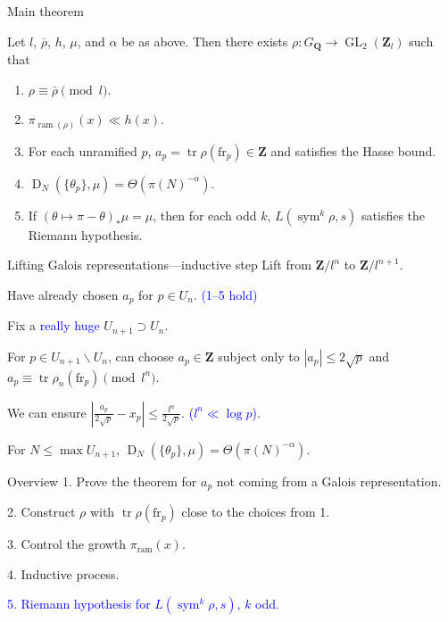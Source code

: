 \documentclass{beamer}
\DeclareMathOperator{\D}{D}
\DeclareMathOperator{\GL}{GL}
\DeclareMathOperator{\ram}{ram}
\DeclareMathOperator{\sym}{sym}
\DeclareMathOperator{\tr}{tr}
\newcommand{\bQ}{\mathbf{Q}}
\newcommand{\bZ}{\mathbf{Z}}
\newcommand{\frob}{\mathrm{fr}}
\begin{document}
\begin{frame}{Main theorem}
\begin{theorem}[M.]
Let $l$, $\bar\rho$, $h$, $\mu$, and $\alpha$ be as above. Then there exists 
$\rho\colon G_\bQ \to \GL_2(\bZ_l)$ such that 
\begin{enumerate}
\item
$\rho \equiv \bar\rho\pmod{l}$. 

\item
$\pi_{\ram(\rho)}(x) \ll h(x)$. 

\item
For each unramified $p$, $a_p = \tr \rho(\frob_p)\in \bZ$ and satisfies the 
Hasse bound.

\item
$\D_N(\{\theta_p\},\mu) = \Theta(\pi(N)^{-\alpha})$. 

\item
If $(\theta\mapsto \pi-\theta)_\ast \mu = \mu$, then for each odd $k$, 
$L(\sym^k \rho,s)$ satisfies the Riemann hypothesis. 
\end{enumerate}
\end{theorem}
\end{frame}



\begin{frame}{Lifting Galois representations---inductive step}
Lift from $\bZ/l^n$ to $\bZ/l^{n+1}$. 
\pause

Have already chosen $a_p$ for $p\in U_n$. 
\pause
\textcolor{blue}{(1--5 hold)}
\pause

Fix a \textcolor{blue}{really huge} $U_{n+1}\supset U_n$.
\pause

For $p\in U_{n+1}\smallsetminus U_n$, can choose $a_p\in \bZ$ subject only to 
$|a_p| \leqslant 2\sqrt p$ and $a_p \equiv \tr\rho_n(\frob_p)\pmod{l^n}$. 
\pause

We can ensure 
$\left| \frac{a_p}{2\sqrt p} - x_p\right| \leqslant \frac{l^n}{2\sqrt p}$.
\pause
\textcolor{blue}{($l^n \ll \log p$)}.
\pause

For $N\leqslant \max U_{n+1}$, $\D_N(\{\theta_p\},\mu) = \Theta(\pi(N)^{-\alpha})$. 
\end{frame}



\begin{frame}{Overview}
\color{gray}
1. Prove the theorem for $a_p$ not coming from a Galois representation.

2. Construct $\rho$ with $\tr\rho(\frob_p)$ close to the choices from 1.

3. Control the growth $\pi_{\ram}(x)$. 

4. Inductive process.

\textcolor{blue}{
5. Riemann hypothesis for $L(\sym^k\rho,s)$, $k$ odd.}
\end{frame}
\end{document}
